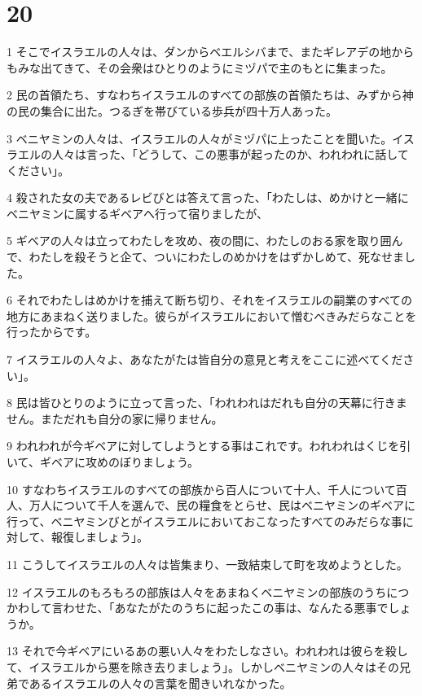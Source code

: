 \chapter{20}

\par 1 そこでイスラエルの人々は、ダンからベエルシバまで、またギレアデの地からもみな出てきて、その会衆はひとりのようにミヅパで主のもとに集まった。
\par 2 民の首領たち、すなわちイスラエルのすべての部族の首領たちは、みずから神の民の集合に出た。つるぎを帯びている歩兵が四十万人あった。
\par 3 ベニヤミンの人々は、イスラエルの人々がミヅパに上ったことを聞いた。イスラエルの人々は言った、「どうして、この悪事が起ったのか、われわれに話してください」。
\par 4 殺された女の夫であるレビびとは答えて言った、「わたしは、めかけと一緒にベニヤミンに属するギベアへ行って宿りましたが、
\par 5 ギベアの人々は立ってわたしを攻め、夜の間に、わたしのおる家を取り囲んで、わたしを殺そうと企て、ついにわたしのめかけをはずかしめて、死なせました。
\par 6 それでわたしはめかけを捕えて断ち切り、それをイスラエルの嗣業のすべての地方にあまねく送りました。彼らがイスラエルにおいて憎むべきみだらなことを行ったからです。
\par 7 イスラエルの人々よ、あなたがたは皆自分の意見と考えをここに述べてください」。
\par 8 民は皆ひとりのように立って言った、「われわれはだれも自分の天幕に行きません。まただれも自分の家に帰りません。
\par 9 われわれが今ギベアに対してしようとする事はこれです。われわれはくじを引いて、ギベアに攻めのぼりましょう。
\par 10 すなわちイスラエルのすべての部族から百人について十人、千人について百人、万人について千人を選んで、民の糧食をとらせ、民はベニヤミンのギベアに行って、ベニヤミンびとがイスラエルにおいておこなったすべてのみだらな事に対して、報復しましょう」。
\par 11 こうしてイスラエルの人々は皆集まり、一致結束して町を攻めようとした。
\par 12 イスラエルのもろもろの部族は人々をあまねくベニヤミンの部族のうちにつかわして言わせた、「あなたがたのうちに起ったこの事は、なんたる悪事でしょうか。
\par 13 それで今ギベアにいるあの悪い人々をわたしなさい。われわれは彼らを殺して、イスラエルから悪を除き去りましょう」。しかしベニヤミンの人々はその兄弟であるイスラエルの人々の言葉を聞きいれなかった。
